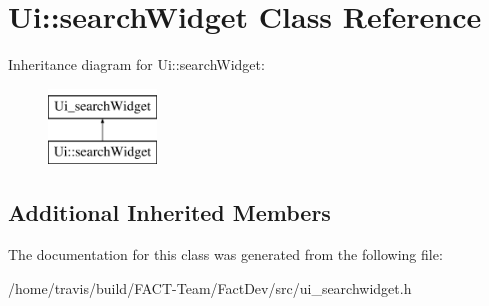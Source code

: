 \hypertarget{classUi_1_1searchWidget}{\section{Ui\-:\-:search\-Widget Class Reference}
\label{classUi_1_1searchWidget}
}
Inheritance diagram for Ui\-:\-:search\-Widget\-:\begin{figure}[H]
\begin{center}
\leavevmode
\includegraphics[height=2.000000cm]{dd/d88/classUi_1_1searchWidget}
\end{center}
\end{figure}
\subsection*{Additional Inherited Members}


The documentation for this class was generated from the following file\-:\begin{DoxyCompactItemize}
\item 
/home/travis/build/\-F\-A\-C\-T-\/\-Team/\-Fact\-Dev/src/ui\-\_\-searchwidget.\-h\end{DoxyCompactItemize}

